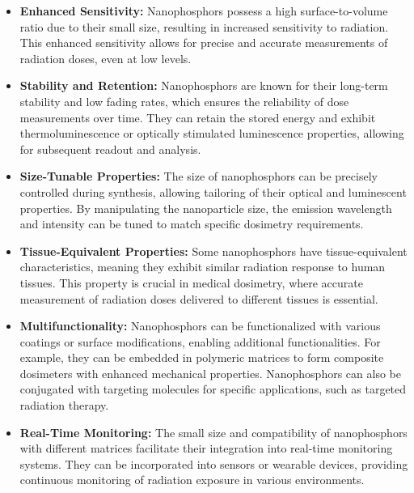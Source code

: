 \documentclass[../../Report.tex]{subfiles}
\begin{document}
        \begin{itemize}
            \item \textbf{Enhanced Sensitivity: } Nanophosphors possess a high surface-to-volume ratio due to 
            their small size, resulting in increased sensitivity to radiation. This enhanced sensitivity 
            allows for precise and accurate measurements of radiation doses, even at low levels.
    
            \item \textbf{Stability and Retention: } Nanophosphors are known for their long-term stability 
            and low fading rates, which ensures the reliability of dose measurements over time. They can 
            retain the stored energy and exhibit thermoluminescence or optically stimulated luminescence 
            properties, allowing for subsequent readout and analysis.

            \item \textbf{Size-Tunable Properties: } The size of nanophosphors can be precisely controlled 
            during synthesis, allowing tailoring of their optical and luminescent properties. By manipulating 
            the nanoparticle size, the emission wavelength and intensity can be tuned to match specific 
            dosimetry requirements.

            \item \textbf{Tissue-Equivalent Properties: } Some nanophosphors have tissue-equivalent 
            characteristics, meaning they exhibit similar radiation response to human tissues. This 
            property is crucial in medical dosimetry, where accurate measurement of radiation doses 
            delivered to different tissues is essential.

            \item \textbf{Multifunctionality: } Nanophosphors can be functionalized with various coatings or 
            surface modifications, enabling additional functionalities. For example, they can be embedded in 
            polymeric matrices to form composite dosimeters with enhanced mechanical properties. Nanophosphors 
            can also be conjugated with targeting molecules for specific applications, such as targeted 
            radiation therapy.
    
            \item \textbf{Real-Time Monitoring: } The small size and compatibility of nanophosphors with 
            different matrices facilitate their integration into real-time monitoring systems. They can be 
            incorporated into sensors or wearable devices, providing continuous monitoring of radiation 
            exposure in various environments.

        \end{itemize}
\end{document}
